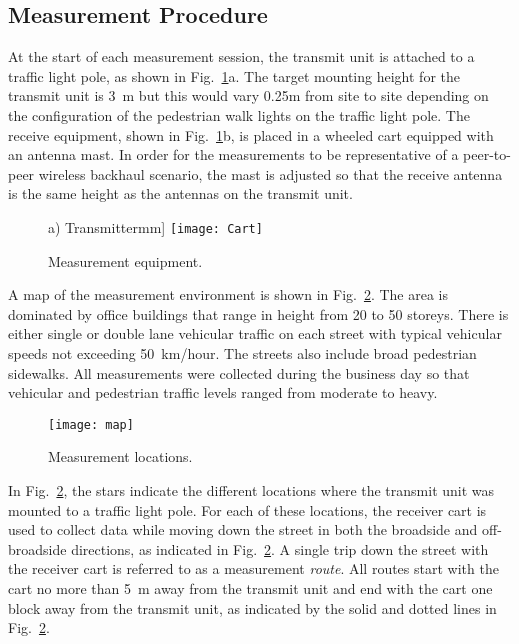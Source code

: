 \documentclass[12pt]{IEEEtran}
\newcommand{\bMiniPage}[1]{\begin{minipage}{#1}}
\newcommand{\eMiniPage}{\end{minipage}}
\begin{document}
\subsection{Measurement Procedure}
\label{ssec:proc}

At the start of each measurement session, the transmit unit is attached to a traffic light pole, as shown in Fig.~\ref{fg.setup}a. The target mounting height for the transmit unit is 3~m but this would vary 0.25m from site to site depending on the configuration of the pedestrian walk lights on the traffic light pole.  The receive equipment, shown in Fig.~\ref{fg.setup}b, is placed in a wheeled cart equipped with an antenna mast.  In order for the measurements to be representative of a peer-to-peer wireless backhaul scenario, the mast is adjusted so that the receive antenna is the same height as the antennas on the transmit unit.

\begin{figure}[htbp]
\centering
\bMiniPage{1.5in}
 \centering
 a) Transmitter\2mm]
 \texttt{[image: Cart]}
\eMiniPage
\caption{Measurement equipment.}
\label{fg.setup}
\end{figure}

A map of the measurement environment is shown in Fig.~\ref{fg.map}.  The area is dominated by office buildings that range in height from 20 to 50 storeys.  There is either single or double lane vehicular traffic on each street with typical vehicular speeds not exceeding 50~km/hour.  The streets also include broad pedestrian sidewalks.  All measurements were collected during the business day so that vehicular and pedestrian traffic levels ranged from moderate to heavy.

\begin{figure}[htbp]
\centerline{\texttt{[image: map]}}
\caption{Measurement locations.}
\label{fg.map}
\end{figure}

In Fig.~\ref{fg.map}, the stars indicate the different locations where the transmit unit was mounted to a traffic light pole.  For each of these locations, the receiver cart is used to collect data while moving down the street in both the broadside and off-broadside directions, as indicated in Fig.~\ref{fg.map}.  A single trip down the street with the receiver cart is referred to as a measurement {\em route}.  All routes start with the cart no more than 5~m away from the transmit unit and end with the cart one block away from the transmit unit, as indicated by the solid and dotted lines in Fig.~\ref{fg.map}.
\end{document}
